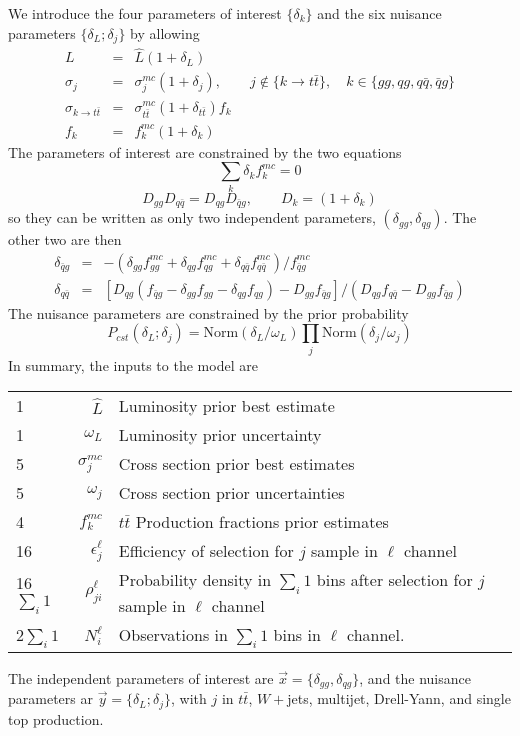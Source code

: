 \documentclass{article}
\begin{document}
We introduce the four parameters of interest $\{\delta_k\}$ and the
six nuisance parameters $\{\delta_L;\delta_j\}$ by allowing
\begin{eqnarray}
  L &=& \hat{L}(1+\delta_L) \\
  \sigma_j &=& \sigma_j^{mc}(1+\delta_j),\qquad j\notin \{k\to t\bar{t}\}, \quad k\in\{gg,qg,q\bar{q},\bar{q}g\}\\
  \sigma_{k\to t\bar{t}} &=& \sigma_{t\bar{t}}^{mc}(1+\delta_{t\bar{t}}) f_k\\
  f_k &=& f_k^{mc}(1+\delta_k)
\end{eqnarray}
The parameters of interest are constrained by the two equations
\begin{equation}
  \sum_k \delta_kf_k^{mc} = 0
\end{equation}
\begin{equation}
  D_{gg}D_{q\bar{q}} = D_{qg}D_{\bar{q}g}, \qquad D_k = (1+\delta_k)
\end{equation}
so they can be written as only two independent parameters,
$(\delta_{gg},\delta_{qg})$.  The other two are then
\begin{eqnarray}
  \delta_{\bar{q}g} &=& -\left(\delta_{gg}f_{gg}^{mc}+\delta_{qg}f_{qg}^{mc}+\delta_{q\bar{q}}f_{q\bar{q}}^{mc}\right)/f_{\bar{q}g}^{mc}\\
  \delta_{q\bar{q}} &=& \left[D_{qg}(f_{\bar{q}g} - \delta_{gg}f_{gg} - \delta_{qg}f_{qg}) - D_{gg}f_{\bar{q}g}\right] / (D_{qg}f_{q\bar{q}} - D_{gg}f_{\bar{q}g})
\end{eqnarray}
The nuisance parameters are constrained by the prior probability
\begin{equation}
  P_{cst}(\delta_L;\delta_j) = \mathrm{Norm}(\delta_L/\omega_L)\prod_j\mathrm{Norm}(\delta_j/\omega_j)
\end{equation}
In summary, the inputs to the model are
\begin{center}
  \begin{tabular}{lrl}
    1&$\hat{L}$ & Luminosity prior best estimate \\
    1&$\omega_L$ & Luminosity prior uncertainty\\
    5&$\sigma_j^{mc}$ & Cross section prior best estimates\\
    5&$\omega_j$ & Cross section prior uncertainties\\
    4&$f^{mc}_k$ & $t\bar{t}$ Production fractions prior estimates\\
    16&$\epsilon_j^\ell$ & Efficiency of selection for $j$ sample in $\ell$ channel\\
    16$\sum_i1$&$\rho_{ji}^\ell$ & Probability density in $\sum_i1$ bins after selection for $j$ sample in $\ell$ channel\\
    2$\sum_i1$&$N_i^\ell$ & Observations in $\sum_i1$ bins in $\ell$ channel.
  \end{tabular}
\end{center}
The independent parameters of interest are $\vec{x} =
\{\delta_{gg},\delta_{qg}\}$, and the nuisance parameters ar $\vec{y}
= \{\delta_L;\delta_j\}$, with $j$ in $t\bar{t}$, $W+$jets, multijet,
Drell-Yann, and single top production.
\end{document}
